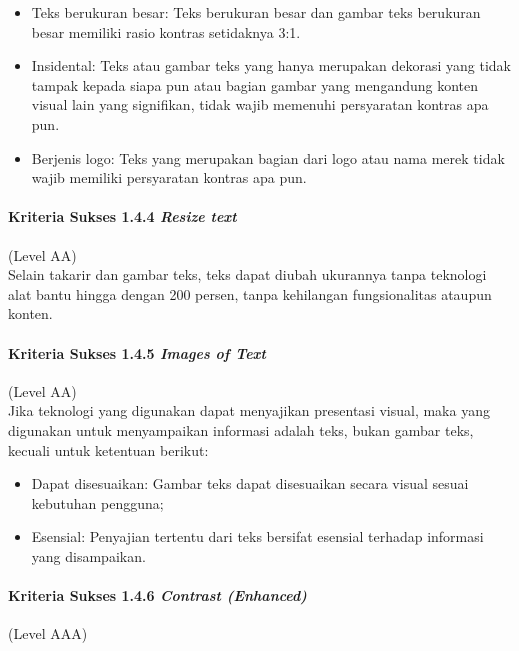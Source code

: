 \begin{itemize}
	\item Teks berukuran besar: Teks berukuran besar dan gambar teks berukuran besar memiliki rasio kontras setidaknya 3:1.
	\item Insidental: Teks atau gambar teks yang hanya merupakan dekorasi yang tidak tampak kepada siapa pun atau bagian gambar yang mengandung konten visual lain yang signifikan, tidak wajib memenuhi persyaratan kontras apa pun.
	\item Berjenis logo: Teks yang merupakan bagian dari logo atau nama merek tidak wajib memiliki persyaratan kontras apa pun.
\end{itemize}

\paragraph{Kriteria Sukses 1.4.4 \textit{Resize text}}
\label{sec:kriteria_sukses_1.4.4}
(Level AA)\\

Selain takarir dan gambar teks, teks dapat diubah ukurannya tanpa teknologi alat bantu hingga dengan 200 persen, tanpa kehilangan fungsionalitas ataupun konten.

\paragraph{Kriteria Sukses 1.4.5 \textit{Images of Text}}
\label{sec:kriteria_sukses_1.4.5}
(Level AA)\\

Jika teknologi yang digunakan dapat menyajikan presentasi visual, maka yang digunakan untuk menyampaikan informasi adalah teks, bukan gambar teks, kecuali untuk ketentuan berikut:

\begin{itemize}
	\item Dapat disesuaikan: Gambar teks dapat disesuaikan secara visual sesuai kebutuhan pengguna;
	\item Esensial: Penyajian tertentu dari teks bersifat esensial terhadap informasi yang disampaikan.
\end{itemize}

\paragraph{Kriteria Sukses 1.4.6 \textit{Contrast (Enhanced)}}
\label{sec:kriteria_sukses_1.4.6}
(Level AAA)\\

